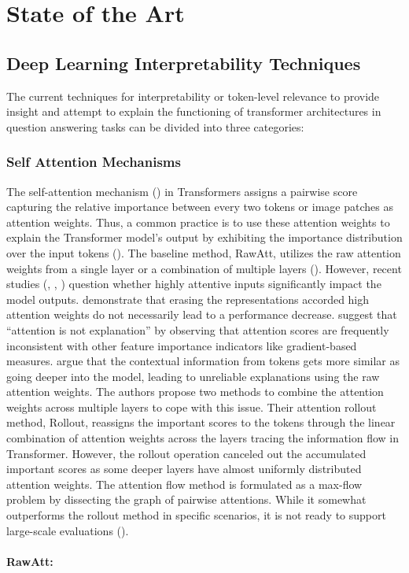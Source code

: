 \section{State of the Art}\label{sec:state_of_art}


\subsection{Deep Learning Interpretability Techniques}
The current techniques for interpretability or token-level relevance to provide insight and attempt to explain the functioning of transformer architectures in question answering tasks can be divided into three categories:

\subsubsection{Self Attention Mechanisms} 

The self-attention mechanism (\cite{bahdanau2014neural}) in Transformers assigns a pairwise score capturing the relative importance between every two tokens or image patches as attention weights. Thus, a common practice is to use these attention weights to explain the Transformer model’s output by exhibiting the importance distribution over the input tokens (\cite{clark2019does}). The baseline method, RawAtt, utilizes the raw attention weights from a single layer or a combination of multiple layers (\cite{kovaleva2019revealing}). However, recent studies (\cite{serrano2019attention}, \cite{jain2019attention}, \cite{abnar2020quantifying}) question whether highly attentive inputs significantly impact the model outputs. \cite{serrano2019attention} demonstrate that erasing the representations accorded high
attention weights do not necessarily lead to a performance decrease. \cite{jain2019attention} suggest that
“attention is not explanation” by observing that attention scores are frequently inconsistent with other
feature importance indicators like gradient-based measures. \cite{abnar2020quantifying} argue that the contextual
information from tokens gets more similar as going deeper into the model, leading to unreliable explanations using the raw attention weights. The authors propose two methods to combine the attention weights across multiple layers to cope with this issue. Their attention rollout method, Rollout, reassigns the important scores to the tokens through the linear combination of attention weights across the layers tracing the information flow in Transformer. However, the rollout operation canceled out the accumulated important scores as some deeper layers have almost uniformly distributed attention weights. The attention flow method is formulated as a max-flow
problem by dissecting the graph of pairwise attentions. While it somewhat outperforms the rollout method in specific scenarios, it is not ready to support large-scale evaluations (\cite{chefer2021transformer}).
\\\\
\textbf{RawAtt:}

